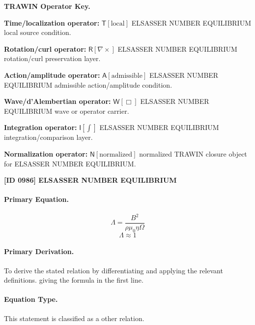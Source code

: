\par\vspace{0.45\baselineskip}
\noindent\begin{minipage}[t]{\linewidth}
\begingroup
\small
\raggedright
\textbf{TRAWIN Operator Key.}\par
\noindent\textbf{Time/localization operator:} $\mathsf{T}\!\left[\mathrm{local}\right]$ ELSASSER NUMBER EQUILIBRIUM local source condition.\par
\noindent\textbf{Rotation/curl operator:} $\mathsf{R}\!\left[\nabla\times\right]$ ELSASSER NUMBER EQUILIBRIUM rotation/curl preservation layer.\par
\noindent\textbf{Action/amplitude operator:} $\mathsf{A}\!\left[\mathrm{admissible}\right]$ ELSASSER NUMBER EQUILIBRIUM admissible action/amplitude condition.\par
\noindent\textbf{Wave/d'Alembertian operator:} $\mathsf{W}\!\left[\Box\right]$ ELSASSER NUMBER EQUILIBRIUM wave or operator carrier.\par
\noindent\textbf{Integration operator:} $\mathsf{I}\!\left[\int\right]$ ELSASSER NUMBER EQUILIBRIUM integration/comparison layer.\par
\noindent\textbf{Normalization operator:} $\mathsf{N}\!\left[\mathrm{normalized}\right]$ normalized TRAWIN closure object for ELSASSER NUMBER EQUILIBRIUM.\par
\endgroup
\end{minipage}

\clearpage
\noindent\textbf{[ID 0986] ELSASSER NUMBER EQUILIBRIUM}\par
\vspace{0.35em}
\paragraph{Primary Equation.}
\[
\Lambda=\frac{B^2}{\rho\mu_0\eta\Omega}
\]
\[
\Lambda\approx 1
\]

\paragraph{Primary Derivation.}
To derive the stated relation by differentiating and applying the relevant definitions. giving the formula in the first line.
\paragraph{Equation Type.}
This statement is classified as a other relation.


